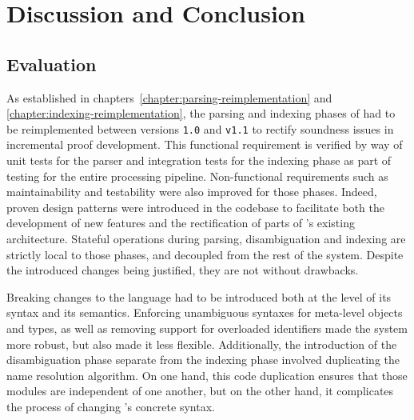 \chapter{Discussion and Conclusion}

\section{Evaluation}

As established in chapters~\ref{chapter:parsing-reimplementation} and \ref{chapter:indexing-reimplementation}, the parsing and indexing phases of \Beluga had to be reimplemented between versions \texttt{1.0} and \texttt{v1.1} to rectify soundness issues in incremental proof development.
This functional requirement is verified by way of unit tests for the parser and integration tests for the indexing phase as part of testing for the entire processing pipeline.
Non-functional requirements such as maintainability and testability were also improved for those phases.
Indeed, proven design patterns were introduced in the codebase to facilitate both the development of new features and the rectification of parts of \Beluga's existing architecture.
Stateful operations during parsing, disambiguation and indexing are strictly local to those phases, and decoupled from the rest of the system.
Despite the introduced changes being justified, they are not without drawbacks.

Breaking changes to the \Beluga language had to be introduced both at the level of its syntax and its semantics.
Enforcing unambiguous syntaxes for meta-level objects and types, as well as removing support for overloaded identifiers made the system more robust, but also made it less flexible.
Additionally, the introduction of the disambiguation phase separate from the indexing phase involved duplicating the name resolution algorithm.
On one hand, this code duplication ensures that those modules are independent of one another, but on the other hand, it complicates the process of changing \Beluga's concrete syntax.


